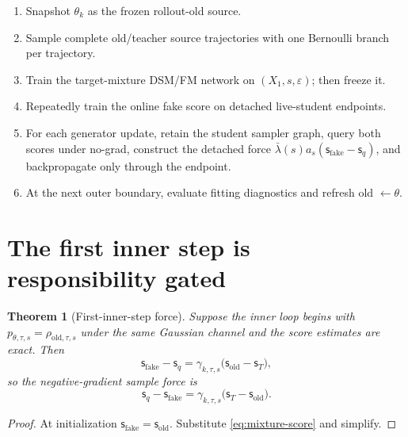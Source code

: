 \documentclass[11pt,a4paper]{article}
\newcommand{\old}{\mathrm{old}}
\newcommand{\fake}{\mathrm{fake}}
\newcommand{\score}{\mathsf{s}}
\theoremstyle{plain}
\newtheorem{theorem}{Theorem}[section]
\theoremstyle{definition}
\begin{document}
\begin{tcolorbox}[
  colback=green!5,
  colframe=green!50!black,
  title=Algorithm 1: one outer iteration of proposed MoD-DMD]
\begin{enumerate}[leftmargin=1.6em]
\item Snapshot $\theta_k$ as the frozen rollout-old source.
\item Sample complete old/teacher source trajectories with one Bernoulli branch per trajectory.
\item Train the target-mixture DSM/FM network on $(X_1,s,\varepsilon)$; then freeze it.
\item Repeatedly train the online fake score on detached live-student endpoints.
\item For each generator update, retain the student sampler graph, query both scores under
      no-grad, construct the detached force
      $\bar\lambda(s)a_s(\score_{\fake}-\score_q)$, and backpropagate only through the endpoint.
\item At the next outer boundary, evaluate fitting diagnostics and refresh old
      $\leftarrow\theta$.
\end{enumerate}
\end{tcolorbox}

\section{The first inner step is responsibility gated}
\label{sec:first-step}

\begin{theorem}[First-inner-step force]
\label{thm:first-step}
Suppose the inner loop begins with
$p_{\theta,\tau,s}=\rho_{\old,\tau,s}$ under the same Gaussian channel and the score estimates
are exact.  Then
\begin{equation}
\score_{\fake}-\score_q
=\gamma_{k,\tau,s}\bigl(\score_{\old}-\score_T\bigr),
\label{eq:first-gradient}
\end{equation}
so the negative-gradient sample force is
\begin{equation}
\boxed{
\score_q-\score_{\fake}
=\gamma_{k,\tau,s}\bigl(\score_T-\score_{\old}\bigr).
}
\label{eq:first-force}
\end{equation}
\end{theorem}

\begin{proof}
At initialization $\score_{\fake}=\score_{\old}$.  Substitute
\eqref{eq:mixture-score} and simplify.
\end{proof}
\end{document}
